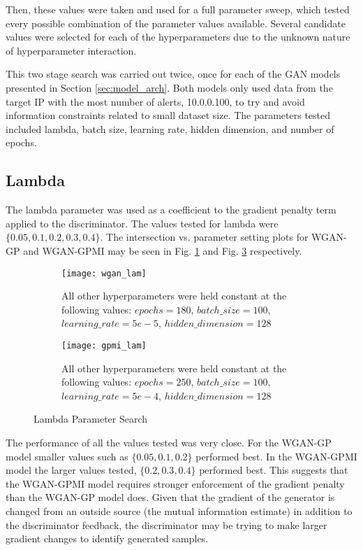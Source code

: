 Then, these values were taken and used for a full parameter sweep, which tested every possible combination of the parameter values available. Several candidate values were selected for each of the hyperparameters due to the unknown nature of hyperparameter interaction.

This two stage search was carried out twice, once for each of the GAN models presented in Section \ref{sec:model_arch}. Both models only used data from the target IP with the most number of alerts, 10.0.0.100, to try and avoid information constraints related to small dataset size. The parameters tested included lambda, batch size, learning rate, hidden dimension, and number of epochs.

\subsection{Lambda}
\label{sec:lam}
The lambda parameter was used as a coefficient to the gradient penalty term applied to the discriminator. The values tested for lambda were $\{0.05, 0.1, 0.2, 0.3, 0.4\}$. The intersection vs. parameter setting plots for WGAN-GP and WGAN-GPMI may be seen in Fig. \ref{fig:wgan_lam} and Fig. \ref{fig:gpmi_lam} respectively.

\begin{figure}[!htbp]
	\centering

	\begin{subfigure}{.7\textwidth}
		\texttt{[image: wgan\_lam]}
	\end{subfigure}%
	\begin{subfigure}{.3\textwidth}
		\caption{
			All other hyperparameters were held constant at the following values: $epochs=180$, $batch\_size = 100$, $learning\_rate=5e-5$, $hidden\_dimension=128$
		}
		\label{fig:wgan_lam}
	\end{subfigure}%

	\begin{subfigure}{.7\textwidth}
		\texttt{[image: gpmi\_lam]}
	\end{subfigure}%
	\begin{subfigure}{.3\textwidth}
		\caption{
			All other hyperparameters were held constant at the following values: $epochs=250$, $batch\_size=100$, $learning\_rate=5e-4$, $hidden\_dimension=128$
		}
		\label{fig:gpmi_lam}
	\end{subfigure}%
	\caption{Lambda Parameter Search}
\end{figure}

The performance of all the values tested was very close. For the WGAN-GP model smaller values such as $\{0.05, 0.1, 0.2\}$ performed best. In the WGAN-GPMI model the larger values tested, $\{0.2,0.3,0.4\}$ performed best. This suggests that the WGAN-GPMI model requires stronger enforcement of the gradient penalty than the WGAN-GP model does. Given that the gradient of the generator is changed from an outside source (the mutual information estimate) in addition to the discriminator feedback, the discriminator may be trying to make larger gradient changes to identify generated samples.

